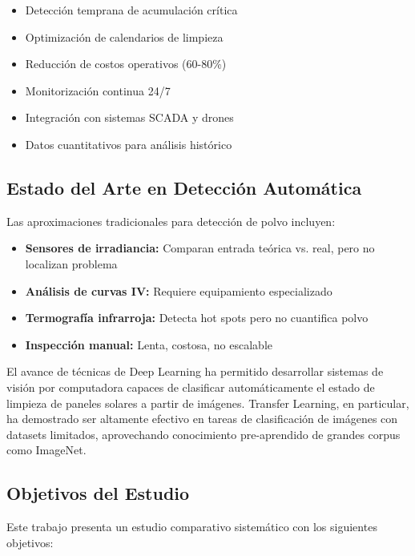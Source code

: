 \documentclass[11pt, a4paper]{article}
\begin{document}
\begin{itemize}
    \item Detección temprana de acumulación crítica
    \item Optimización de calendarios de limpieza
    \item Reducción de costos operativos (60-80\%)
    \item Monitorización continua 24/7
    \item Integración con sistemas SCADA y drones
    \item Datos cuantitativos para análisis histórico
\end{itemize}

\subsection{Estado del Arte en Detección Automática}

Las aproximaciones tradicionales para detección de polvo incluyen:

\begin{itemize}
    \item \textbf{Sensores de irradiancia:} Comparan entrada teórica vs. real, pero no localizan problema
    \item \textbf{Análisis de curvas IV:} Requiere equipamiento especializado
    \item \textbf{Termografía infrarroja:} Detecta hot spots pero no cuantifica polvo
    \item \textbf{Inspección manual:} Lenta, costosa, no escalable
\end{itemize}

El avance de técnicas de Deep Learning ha permitido desarrollar sistemas de visión por computadora capaces de clasificar automáticamente el estado de limpieza de paneles solares a partir de imágenes. Transfer Learning, en particular, ha demostrado ser altamente efectivo en tareas de clasificación de imágenes con datasets limitados, aprovechando conocimiento pre-aprendido de grandes corpus como ImageNet.

\subsection{Objetivos del Estudio}

Este trabajo presenta un estudio comparativo sistemático con los siguientes objetivos:
\end{document}
